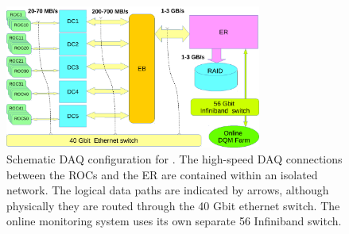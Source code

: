 \begin{figure}[tbp]
\begin{center}
\includegraphics[width=0.75\textwidth]{figures/DAQ_coda.pdf}  
\caption{ \label{fig:CODA}
Schematic DAQ configuration for \gx. The high-speed DAQ connections between the ROCs and the ER are contained within an isolated network. The logical data paths are indicated by arrows,
although physically they are routed through the 40 Gbit ethernet switch.  The online monitoring system uses its own separate 56 Infiniband switch.}

\end{center}
\end{figure}
